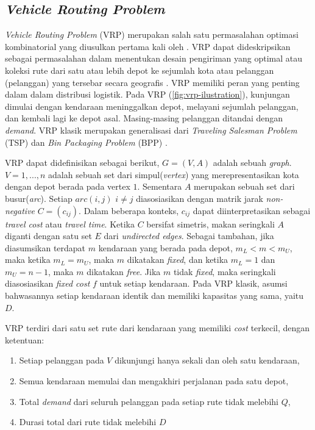 \subsection{\textit{Vehicle Routing Problem}}
\label{ssec:vrp}
\textit{Vehicle Routing Problem} (VRP) merupakan salah satu permasalahan optimasi kombinatorial yang diusulkan pertama kali oleh \citep{dantzig_truck_1959}. VRP dapat dideskripsikan sebagai permasalahan dalam menentukan desain pengiriman yang optimal atau koleksi rute dari satu atau lebih depot ke sejumlah kota atau pelanggan (pelanggan) yang tersebar secara geografis \citep{laporte_vehicle_1992}. VRP memiliki peran yang penting dalam dalam distribusi logistik. Pada VRP (\autoref{fig:vrp-ilustration}), kunjungan dimulai dengan kendaraan meninggalkan depot, melayani sejumlah pelanggan, dan kembali lagi ke depot asal. Masing-masing pelanggan ditandai dengan \textit{demand}. VRP klasik merupakan generalisasi dari \textit{Traveling Salesman Problem} (TSP) dan \textit{Bin Packaging Problem} (BPP) \citep{garey_computers_2002}.


VRP dapat didefinisikan sebagai berikut, $G = (V, A)$ adalah sebuah \textit{graph}. $V = {1,...,n}$ adalah sebuah set dari simpul(\textit{vertex}) yang merepresentasikan kota dengan depot berada pada vertex $1$. Sementara $A$ merupakan sebuah set dari busur(\textit{arc}). Setiap $arc(i, j)$ $i \neq j$ diasosiasikan dengan matrik jarak \textit{non-negative} $C = (c_{ij})$. Dalam beberapa konteks, $c_{ij}$ dapat diinterpretasikan sebagai \textit{travel cost} atau \textit{travel time}. Ketika $C$ bersifat simetris, makan seringkali $A$ diganti dengan satu set $E$ dari \textit{undirected edges}. Sebagai tambahan, jika diasumsikan terdapat $m$ kendaraan yang berada pada depot, $m_L < m < m_U$, maka ketika $m_L = m_U$, maka $m$ dikatakan \textit{fixed}, dan ketika $m_L = 1$ dan $m_U = n - 1$, maka $m$ dikatakan \textit{free}. Jika $m$ tidak \textit{fixed}, maka seringkali diasosiasikan \textit{fixed cost} $f$ untuk setiap kendaraan. Pada VRP klasik, asumsi bahwasannya setiap kendaraan identik dan memiliki kapasitas yang sama, yaitu $D$.


VRP terdiri dari satu set rute dari kendaraan yang memiliki \textit{cost} terkecil, dengan ketentuan:
\begin{enumerate}
\item Setiap pelanggan pada $V$ dikunjungi hanya sekali dan oleh satu kendaraan, 
\item Semua kendaraan memulai dan mengakhiri perjalanan pada satu depot, 
\item Total \textit{demand} dari seluruh pelanggan pada setiap rute tidak melebihi $Q$, 
\item Durasi total dari rute tidak melebihi $D$
\end{enumerate}


